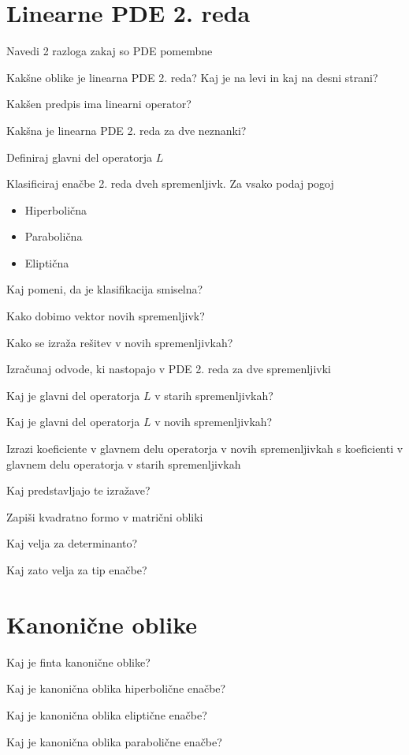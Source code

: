 \documentclass{article}
\begin{document}
    \section{Linearne PDE 2. reda}
    \begin{enumerate}
        \item Navedi 2 razloga zakaj so PDE pomembne
        {\color{red}\item Kakšne oblike je linearna PDE 2. reda? Kaj je na levi in kaj na desni strani?}
        {\color{red}\item Kakšen predpis ima linearni operator?}
        \item Kakšna je linearna PDE 2. reda za dve neznanki?
        \item Definiraj glavni del operatorja $L$
        {\color{red}\item Klasificiraj enačbe 2. reda dveh spremenljivk. Za vsako podaj pogoj}
        {\color{red}\begin{itemize}
            \item Hiperbolična
            \item Parabolična
            \item Eliptična
        \end{itemize}}
        \item Kaj pomeni, da je klasifikacija smiselna?
        {\color{red}\item Kako dobimo vektor novih spremenljivk?}
        {\color{red}\item Kako se izraža rešitev v novih spremenljivkah?}
        \item Izračunaj odvode, ki nastopajo v PDE 2. reda za dve spremenljivki
        \item Kaj je glavni del operatorja $L$ v starih spremenljivkah?
        \item Kaj je glavni del operatorja $L$ v novih spremenljivkah?
        \item Izrazi koeficiente v glavnem delu operatorja v novih spremenljivkah s koeficienti v glavnem delu operatorja v starih spremenljivkah
        {\color{red}\item Kaj predstavljajo te izražave?}
        {\color{red}\item Zapiši kvadratno formo v matrični obliki}
        \item Kaj velja za determinanto?
        \item Kaj zato velja za tip enačbe?
    \end{enumerate}

    \section{Kanonične oblike}
    \begin{enumerate}
        \item Kaj je finta kanonične oblike?
        {\color{red}\item Kaj je kanonična oblika hiperbolične enačbe?}
        \item Kaj je kanonična oblika eliptične enačbe?
        {\color{red}\item Kaj je kanonična oblika parabolične enačbe?}
    \end{enumerate}
\end{document}
